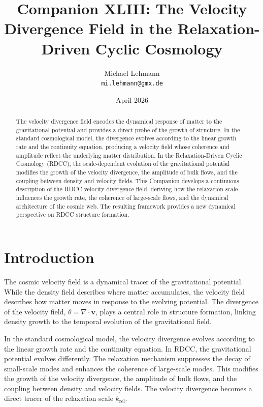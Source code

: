 \documentclass[11pt,a4paper]{article}
\title{\textbf{Companion XLIII: The Velocity Divergence Field in the Relaxation-Driven Cyclic Cosmology}}
\author{Michael Lehmann \\ \texttt{mi.lehmann@gmx.de}}
\date{April 2026}
\begin{document}
\maketitle

\begin{abstract}
The velocity divergence field encodes the dynamical response of matter to the 
gravitational potential and provides a direct probe of the growth of structure. 
In the standard cosmological model, the divergence evolves according to the linear 
growth rate and the continuity equation, producing a velocity field whose coherence 
and amplitude reflect the underlying matter distribution. In the Relaxation-Driven 
Cyclic Cosmology (RDCC), the scale-dependent evolution of the gravitational 
potential modifies the growth of the velocity divergence, the amplitude of bulk 
flows, and the coupling between density and velocity fields. This Companion 
develops a continuous description of the RDCC velocity divergence field, deriving 
how the relaxation scale influences the growth rate, the coherence of large-scale 
flows, and the dynamical architecture of the cosmic web. The resulting framework 
provides a new dynamical perspective on RDCC structure formation.
\end{abstract}
\section{Introduction}

The cosmic velocity field is a dynamical tracer of the gravitational potential. 
While the density field describes where matter accumulates, the velocity field 
describes how matter moves in response to the evolving potential. The divergence 
of the velocity field, $\theta = \nabla \cdot \mathbf{v}$, plays a central role in 
structure formation, linking density growth to the temporal evolution of the 
gravitational field.

In the standard cosmological model, the velocity divergence evolves according to 
the linear growth rate and the continuity equation. In RDCC, the gravitational 
potential evolves differently. The relaxation mechanism suppresses the decay of 
small-scale modes and enhances the coherence of large-scale modes. This modifies 
the growth of the velocity divergence, the amplitude of bulk flows, and the 
coupling between density and velocity fields. The velocity divergence becomes a 
direct tracer of the relaxation scale $k_{\mathrm{rel}}$.
\end{document}
